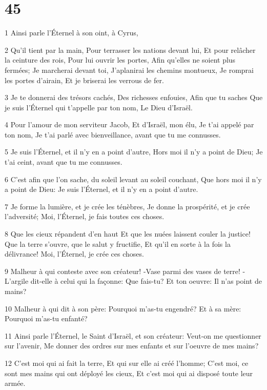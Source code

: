 \chapter{45}

\par 1 Ainsi parle l'Éternel à son oint, à Cyrus,
\par 2 Qu'il tient par la main, Pour terrasser les nations devant lui, Et pour relâcher la ceinture des rois, Pour lui ouvrir les portes, Afin qu'elles ne soient plus fermées; Je marcherai devant toi, J'aplanirai les chemins montueux, Je romprai les portes d'airain, Et je briserai les verrous de fer.
\par 3 Je te donnerai des trésors cachés, Des richesses enfouies, Afin que tu saches Que je suis l'Éternel qui t'appelle par ton nom, Le Dieu d'Israël.
\par 4 Pour l'amour de mon serviteur Jacob, Et d'Israël, mon élu, Je t'ai appelé par ton nom, Je t'ai parlé avec bienveillance, avant que tu me connusses.
\par 5 Je suis l'Éternel, et il n'y en a point d'autre, Hors moi il n'y a point de Dieu; Je t'ai ceint, avant que tu me connusses.
\par 6 C'est afin que l'on sache, du soleil levant au soleil couchant, Que hors moi il n'y a point de Dieu: Je suis l'Éternel, et il n'y en a point d'autre.
\par 7 Je forme la lumière, et je crée les ténèbres, Je donne la prospérité, et je crée l'adversité; Moi, l'Éternel, je fais toutes ces choses.
\par 8 Que les cieux répandent d'en haut Et que les nuées laissent couler la justice! Que la terre s'ouvre, que le salut y fructifie, Et qu'il en sorte à la fois la délivrance! Moi, l'Éternel, je crée ces choses.
\par 9 Malheur à qui conteste avec son créateur! -Vase parmi des vases de terre! -L'argile dit-elle à celui qui la façonne: Que fais-tu? Et ton oeuvre: Il n'as point de mains?
\par 10 Malheur à qui dit à son père: Pourquoi m'as-tu engendré? Et à sa mère: Pourquoi m'as-tu enfanté?
\par 11 Ainsi parle l'Éternel, le Saint d'Israël, et son créateur: Veut-on me questionner sur l'avenir, Me donner des ordres sur mes enfants et sur l'oeuvre de mes mains?
\par 12 C'est moi qui ai fait la terre, Et qui sur elle ai créé l'homme; C'est moi, ce sont mes mains qui ont déployé les cieux, Et c'est moi qui ai disposé toute leur armée.
